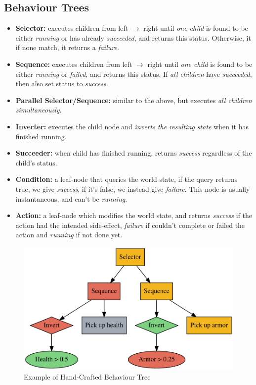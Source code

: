 \documentclass[a4paper, twocolumn]{article}
\begin{document}
        \subsection{Behaviour Trees} \label{sec:behaviour_trees}

        \begin{itemize}
            \item{\textbf{Selector:} executes children from left \(\rightarrow\) right until \emph{one child} is found to be either \emph{running} or has already \emph{succeeded}, and returns this status. Otherwise, it if none match, it returns a \emph{failure}.}
            \item{\textbf{Sequence:} executes children from left \(\rightarrow\) right until \emph{one child} is found to be either \emph{running} or \emph{failed}, and returns this status. If \emph{all children} have \emph{succeeded}, then also set status to \emph{success}.}
            \item{\textbf{Parallel Selector/Sequence:} similar to the above, but executes \emph{all children simultaneously}.}
            \item{\textbf{Inverter:} executes the child node and \emph{inverts the resulting state} when it has finished running.}
            \item{\textbf{Succeeder:} when child has finished running, returns \emph{success} regardless of the child's status.}
            \item{\textbf{Condition:} a leaf-node that queries the world state, if the query returns true, we give \emph{success}, if it's false, we instead give \emph{failure}. This node is usually instantaneous, and can't be \emph{running}.}
            \item{\textbf{Action:} a leaf-node which modifies the world state, and returns \emph{success} if the action had the intended side-effect, \emph{failure} if couldn't complete or failed the action and \emph{running} if not done yet.}

        \end{itemize}

        \begin{figure}[H]
            \centering
            \includegraphics[width=\linewidth]{share/behaviour_tree.pdf}
            \caption{Example of Hand-Crafted Behaviour Tree}
            \label{fig:behaviour_tree}
        \end{figure}
\end{document}
